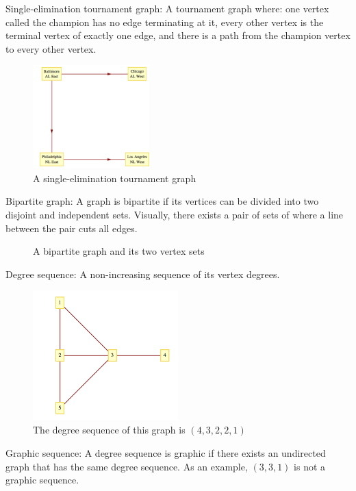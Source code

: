 \documentclass{article}
\begin{document}
Single-elimination tournament graph: A tournament graph where: one vertex called the champion has no edge terminating at it, every other vertex is the terminal vertex of exactly one edge, and there is a path from the champion vertex to every other vertex.

\begin{figure}[htb]
    \caption{A single-elimination tournament graph}
    \centering
    \includegraphics[width=0.4\textwidth]{fig-mlb-1983-9-1.png}
\end{figure}

Bipartite graph: A graph is bipartite if its vertices can be divided into two disjoint and independent sets. Visually, there exists a pair of sets of where a line between the pair cuts all edges.

\begin{figure}[htb]
    \caption{A bipartite graph and its two vertex sets}
    \centering
    
\end{figure}

Degree sequence: A non-increasing sequence of its vertex degrees.

\begin{figure}[htb!]
    \caption{The degree sequence of this graph is $(4, 3, 2, 2, 1)$}
    \centering
    \includegraphics[width=0.5\textwidth]{fig-degrees-example-9-1.png}
\end{figure}

Graphic sequence: A degree sequence is graphic if there exists an undirected graph that has the same degree sequence. As an example, $(3, 3, 1)$ is not a graphic sequence.
\end{document}

